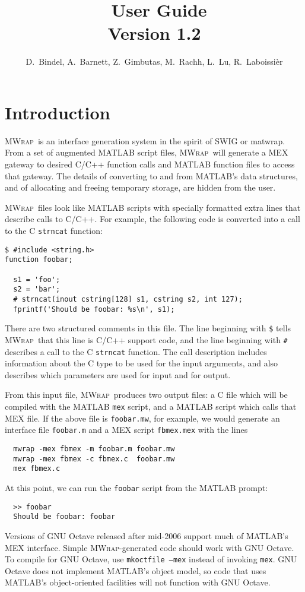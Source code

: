 \documentclass[12pt]{article}
\title{\mwrap\ User Guide\\ Version 1.2}
\author{D.~Bindel, A.~Barnett, Z.~Gimbutas, M.~Rachh, L.~Lu, R.~Laboissi\` er}
\newcommand{\mwrap}{\textsc{MWrap}}
\begin{document}
\maketitle

\section{Introduction}

\mwrap\ is an interface generation system in the spirit of SWIG or
matwrap.  From a set of augmented MATLAB script files, \mwrap\ will
generate a MEX gateway to desired C/C++ function calls and MATLAB
function files to access that gateway.  The details of converting to
and from MATLAB's data structures, and of allocating and freeing
temporary storage, are hidden from the user.

\mwrap\ files look like MATLAB scripts with specially formatted
extra lines that describe calls to C/C++.  For example, the following
code is converted into a call to the C {\tt strncat} function:
\begin{verbatim}
$ #include <string.h>
function foobar;

  s1 = 'foo';
  s2 = 'bar';
  # strncat(inout cstring[128] s1, cstring s2, int 127);
  fprintf('Should be foobar: %s\n', s1);
\end{verbatim}
There are two structured comments in this file.  The line
beginning with \verb|$| tells \mwrap\ that this line is C/C++
support code, and the line beginning with \verb|#| describes
a call to the C {\tt strncat} function.  The call description
includes information about the C type to be used for the input
arguments, and also describes which parameters are used for input
and for output.

From this input file, \mwrap\ produces two output files: a C file
which will be compiled with the MATLAB {\tt mex} script, and a MATLAB
script which calls that MEX file.  If the above file is {\tt foobar.mw},
for example, we would generate an interface file {\tt foobar.m} and a
MEX script {\tt fbmex.mex} with the lines
\begin{verbatim}
  mwrap -mex fbmex -m foobar.m foobar.mw
  mwrap -mex fbmex -c fbmex.c  foobar.mw
  mex fbmex.c
\end{verbatim}
At this point, we can run the {\tt foobar} script from the MATLAB prompt:
\begin{verbatim}
  >> foobar
  Should be foobar: foobar
\end{verbatim}

Versions of GNU Octave released after mid-2006 support much of
MATLAB's MEX interface.  Simple {\mwrap}-generated code should work
with GNU Octave.  To compile for GNU Octave, use \texttt{mkoctfile
  --mex} instead of invoking \texttt{mex}.  GNU Octave does not
implement MATLAB's object model, so code that uses MATLAB's
object-oriented facilities will not function with GNU Octave.
\end{document}

